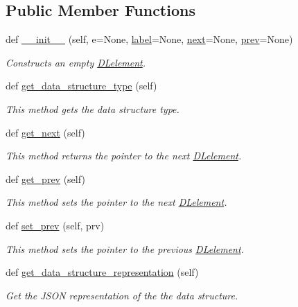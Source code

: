 \subsection*{Public Member Functions}
\begin{DoxyCompactItemize}
\item 
def \mbox{\hyperlink{class_bridges_1_1_d_lelement_1_1_d_lelement_ab25b4475c850ba7ec3b326df8e43e861}{\+\_\+\+\_\+init\+\_\+\+\_\+}} (self, e=None, \mbox{\hyperlink{class_bridges_1_1_element_1_1_element_a301fe5be8cf72b2c62f6a218feeb9166}{label}}=None, \mbox{\hyperlink{class_bridges_1_1_s_lelement_1_1_s_lelement_a650935f5a68b49de4c222cc4c8b0c778}{next}}=None, \mbox{\hyperlink{class_bridges_1_1_d_lelement_1_1_d_lelement_a08e7ba4d3ea7b49409b470752ca75ad1}{prev}}=None)
\begin{DoxyCompactList}\small\item\em Constructs an empty \mbox{\hyperlink{class_bridges_1_1_d_lelement_1_1_d_lelement}{D\+Lelement}}. \end{DoxyCompactList}\item 
def \mbox{\hyperlink{class_bridges_1_1_d_lelement_1_1_d_lelement_af8a80f719f6f8c7b9f5e45fe11d250ea}{get\+\_\+data\+\_\+structure\+\_\+type}} (self)
\begin{DoxyCompactList}\small\item\em This method gets the data structure type. \end{DoxyCompactList}\item 
def \mbox{\hyperlink{class_bridges_1_1_d_lelement_1_1_d_lelement_ab3aae005a6e37d25b7d7c6c4cb1bdecf}{get\+\_\+next}} (self)
\begin{DoxyCompactList}\small\item\em This method returns the pointer to the next \mbox{\hyperlink{class_bridges_1_1_d_lelement_1_1_d_lelement}{D\+Lelement}}. \end{DoxyCompactList}\item 
def \mbox{\hyperlink{class_bridges_1_1_d_lelement_1_1_d_lelement_a012742f29626676f4e99d1f54e9dd10d}{get\+\_\+prev}} (self)
\begin{DoxyCompactList}\small\item\em This method sets the pointer to the next \mbox{\hyperlink{class_bridges_1_1_d_lelement_1_1_d_lelement}{D\+Lelement}}. \end{DoxyCompactList}\item 
def \mbox{\hyperlink{class_bridges_1_1_d_lelement_1_1_d_lelement_a34acbe81af0c0c90640383363fe0aadc}{set\+\_\+prev}} (self, prv)
\begin{DoxyCompactList}\small\item\em This method sets the pointer to the previous \mbox{\hyperlink{class_bridges_1_1_d_lelement_1_1_d_lelement}{D\+Lelement}}. \end{DoxyCompactList}\item 
def \mbox{\hyperlink{class_bridges_1_1_d_lelement_1_1_d_lelement_ab913276df8a2b51c2d944aaa5b8a9790}{get\+\_\+data\+\_\+structure\+\_\+representation}} (self)
\begin{DoxyCompactList}\small\item\em Get the J\+S\+ON representation of the the data structure. \end{DoxyCompactList}\end{DoxyCompactItemize}
